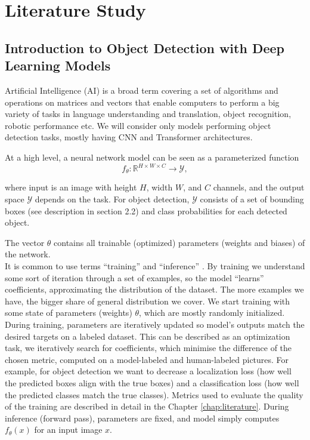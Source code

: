 \documentclass[12pt,a4paper]{report}
\begin{document}
\chapter{Literature Study}
\noindent
\section{Introduction to Object Detection with Deep Learning Models}

Artificial Intelligence (AI) is a broad term covering a set of algorithms and operations on
matrices and vectors that enable computers to perform a big variety of tasks in language
understanding and translation, object recognition, robotic performance etc.
We will consider only models performing object detection tasks, mostly having CNN
\cite{krizhevsky2012imagenet}
and Transformer \cite{vaswani2017attention} architectures.

At a high level, a neural network model can be seen as a parameterized function
\[
    f_\theta : \mathbb{R}^{H \times W \times C} \rightarrow \mathcal{Y},
\]

where input is an image with height \(H\), width \(W\), and \(C\) channels, and the output space
\(\mathcal{Y}\) depends on the task. For object detection,
\(\mathcal{Y}\) consists of a set of bounding boxes (see description in section 2.2) and class probabilities
for each detected object.

The vector \(\theta\) contains all trainable (optimized) parameters (weights and biases)
of the network. \\

It is common to use terms \enquote{training} and \enquote{inference} \cite{Goodfellow2016}.
By training we understand some sort
of iteration through a set of examples, so the model \enquote{learns} coefficients, approximating
the distribution of the dataset. The more examples we have, the bigger share of general
distribution we cover. We start training with some state of parameters (weights) \(\theta\), which
are mostly randomly initialized.
During training, parameters are iteratively updated so model’s outputs
match the desired targets on a labeled dataset. This can be described as an optimization task,
we iteratively search for coefficients, which minimise the difference of the chosen metric,
computed on a model-labeled and human-labeled pictures. For example, for object detection we
want to decrease a localization loss (how well the predicted boxes align with the true boxes)
and a classification loss (how well the predicted classes match the true classes).
Metrics used to evaluate the quality of the training are described in detail in
the Chapter \ref{chap:literature}.
During inference (forward pass), parameters are fixed, and model simply computes
\(f_\theta(x)\) for an input image \(x\). \\
\end{document}
